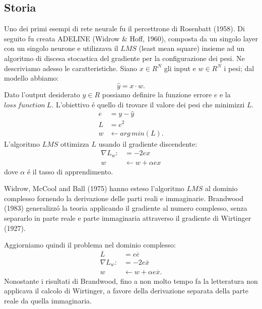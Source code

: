 \documentclass[a4paper,10pt]{article}
\begin{document}
 \subsection{Storia}
 Uno dei primi esempi di rete neurale fu il percettrone di Rosenbatt (1958). Di seguito fu creata ADELINE (Widrow \& Hoff, 1960), composta da un singolo layer con un singolo neurone e utilizzava il $LMS$ (least mean square) insieme ad un algoritmo di discesa stocastica del gradiente per la configurazione dei pesi. Ne descriviamo adesso le caratteristiche. Siano $x \in R^N$ gli input e $w \in R^N$ i pesi; dal modello abbiamo:
 \begin{equation}
  \widehat{y} = x \cdot w.
 \end{equation}
 Dato l'output desiderato $y \in R$ possiamo definire la funzione errore $e$ e la $loss \ function \ L$. L'obiettivo \'e quello di trovare il valore dei pesi che minimizzi $L$.
 \begin{align}
  e &= y - \widehat{y}\\
  L &= e^2\\
  w &\leftarrow arg \, min(L).
 \end{align}
 L'algoritmo $LMS$ ottimizza $L$ usando il gradiente discendente:
 \begin{align}
  \nabla L_w: &= -2ex\\
  w &\leftarrow w + \alpha ex
 \end{align}
 dove $\alpha$ \'e il tasso di apprendimento. 

 Widrow, McCool and Ball (1975) hanno esteso l'algoritmo $LMS$ al dominio complesso fornendo la derivazione delle parti reali e immaginarie. Brandwood (1983) generalizz\'o la teoria applicando il gradiente al numero complesso, senza separarlo in parte reale e parte immaginaria attraverso il gradiente di Wirtinger (1927). 

 Aggiorniamo quindi il problema nel dominio complesso:
 \begin{align}
  L &= e \overline{e}\\
  \nabla L_w : &= -2e\overline{x}\\
  w &\leftarrow w + \alpha e \overline{x}.
 \end{align}
 Nonostante i risultati di Brandwood, fino a non molto tempo fa la letteratura non applicava il calcolo di Wirtinger, a favore della derivazione separata della parte reale da quella immaginaria. 
 
\end{document}
